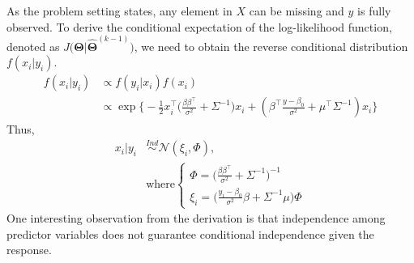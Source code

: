 \documentclass[
  twocolumn]{article}
\begin{document}
As the problem setting states, any element in \(X\) can be missing and
\(y\) is fully observed. To derive the conditional expectation of the
log-likelihood function, denoted as
\(J\big(\boldsymbol{\Theta}|\boldsymbol{\hat{\Theta}}^{(k-1)}\big)\), we
need to obtain the reverse conditional distribution \(f(x_i|y_i)\). \[
\begin{aligned}
f(x_i|y_i) &\propto f(y_i|x_i) f(x_i) \\
&\propto \exp\Big\{ -\frac{1}{2}x_{i}^{\top}\big( \frac{\beta\beta^{\top}}{\sigma^2} + \Sigma^{-1} \big)x_i+
(\beta^{\top} \frac{y-\beta_0}{\sigma^2} + \mu^{\top}\Sigma^{-1})x_i\Big\}
\end{aligned}
\] Thus, \[
\begin{aligned}
x_i | y_i &\overset{Ind}{\sim} \mathcal{N}(\xi_i, \Phi), \\
&\text{where}
\begin{cases}
    \Phi = \big( \frac{\beta\beta^{\top}}{\sigma^2} + \Sigma^{-1} \big)^{-1} \\
    \xi_i = \big( \frac{y_i-\beta_0}{\sigma^2}\beta + \Sigma^{-1}\mu \big)\Phi
\end{cases}
\end{aligned}
\] One interesting observation from the derivation is that independence
among predictor variables does not guarantee conditional independence
given the response.
\end{document}
